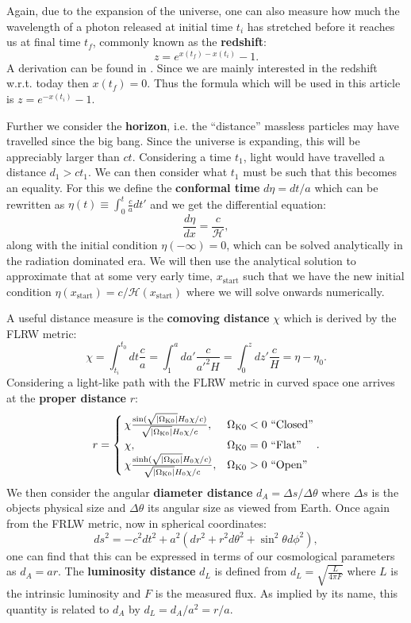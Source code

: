 \documentclass[%
reprint,
 amsmath,amssymb,
 aps,
]{revtex4-2}
\newcommand{\Hp}{\mathcal{H}}
\begin{document}
Again, due to the expansion of the universe, one can also measure how much the wavelength of a photon released at initial time $t_i$ has stretched before it reaches us at final time $t_f$, commonly known as the \textbf{redshift}:
\[z=e^{x(t_f)-x(t_i)}-1.\]
A derivation can be found in \cite{Davis_2004}. Since we are mainly interested in the redshift w.r.t. today then $x(t_f)=0$. Thus the formula which will be used in this article is $z=e^{-x(t_i)}-1$.

Further we consider the \textbf{horizon}, i.e. the ``distance'' massless particles may have travelled since the big bang. Since the universe is expanding, this will be appreciably larger than $ct$. Considering a time $t_1$, light would have travelled a distance $d_1>ct_1$. We can then consider what $t_1$ must be such that this becomes an equality. For this we define the \textbf{conformal time} $d\eta=dt/a$ which can be rewritten as $\eta(t)\equiv\int_0^t\frac{c}{a}dt'$ and we get the differential equation:
\begin{equation}
	\frac{d\eta}{dx}=\frac{c}{\Hp},\label{eq:detaODE}
\end{equation}
along with the initial condition $\eta(-\infty)=0$, which can be solved analytically in the radiation dominated era. We will then use the analytical solution to approximate that at some very early time, $x_\text{start}$ such that we have the new initial condition $\eta(x_\text{start})=c/\Hp(x_\text{start})$ where we will solve onwards numerically. 

A useful distance measure is the \textbf{comoving distance} $\chi$ which is derived by the FLRW metric:
\[\chi=\int_{t_i}^{t_0}dt\frac{c}{a}=\int_1^ada'\frac{c}{a'^2H}=\int_0^zdz'\frac{c}{H}=\eta-\eta_0.\]
Considering a light-like path with the FLRW metric in curved space one arrives at the \textbf{proper distance} $r$:
\[
r=
\begin{cases}
	\,\chi\frac{\sin(\sqrt{\left|\Omega_{\text K0}\right|}H_0\chi/c)}{\sqrt{\left|\Omega_{\text K0}\right|}H_0\chi/c},& \Omega_{\text K0}<0~\text{``Closed''}\\
	\,\chi, & \Omega_{\text K0}=0~\text{``Flat''}\\
	\,\chi\frac{\sinh(\sqrt{\left|\Omega_{\text K0}\right|}H_0\chi/c)}{\sqrt{\left|\Omega_{\text K0}\right|}H_0\chi/c},& \Omega_{\text K0}>0~\text{``Open''}
\end{cases}.
\]
We then consider the angular \textbf{diameter distance} $d_A=\Delta s/\Delta \theta$ where $\Delta s$ is the objects physical size and $\Delta \theta$ its angular size as viewed from Earth. Once again from the FRLW metric, now in spherical coordinates:
\[ds^2=-c^2dt^2+a^2(dr^2+r^2d\theta^2+\sin^2\theta d\phi^2),\]
one can find that this can be expressed in terms of our cosmological parameters as $d_A=ar$. The \textbf{luminosity distance} $d_L$ is defined from $d_L=\sqrt{\frac{L}{4\pi F}}$ where $L$ is the intrinsic luminosity and $F$ is the measured flux. As implied by its name, this quantity is related to $d_A$ by $d_L=d_A/a^2=r/a$. 
\end{document}
